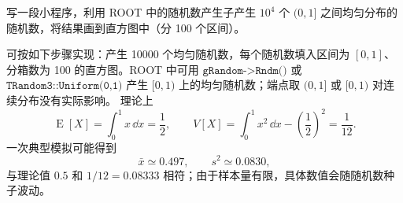 ﻿


\begin{question}
写一段小程序，利用 ROOT 中的随机数产生子产生 \(10^4\) 个 \((0,1]\)
之间均匀分布的随机数，将结果画到直方图中（分 100 个区间）。
\begin{solution}
可按如下步骤实现：产生 10000 个均匀随机数，每个随机数填入区间为
\([0,1]\)、分箱数为 100 的直方图。ROOT 中可用
\(\texttt{gRandom->Rndm()}\) 或 \(\texttt{TRandom3::Uniform(0,1)}\) 产生
\([0,1)\) 上的均匀随机数；端点取 \((0,1]\) 或 \([0,1)\)
对连续分布没有实际影响。
理论上
\[
\operatorname{E}[X]=\int_0^1 x\,\dd{x}=\frac12,
\qquad
V[X]=\int_0^1 x^2\,\dd{x}-\left(\frac12\right)^2=\frac1{12}.
\]
一次典型模拟可能得到
\[
\bar x\simeq0.497,
\qquad
s^2\simeq0.0830,
\]
与理论值 \(0.5\) 和 \(1/12=0.08333\) 相符；由于样本量有限，具体数值会随随机数种子波动。
\end{solution}
\end{question}



